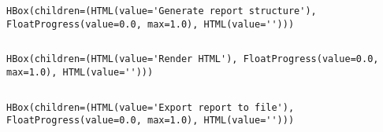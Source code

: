\documentclass[11pt]{article}
\begin{document}
    
    \begin{Verbatim}[commandchars=\\\{\}]
HBox(children=(HTML(value='Generate report structure'), FloatProgress(value=0.0, max=1.0), HTML(value='')))
    \end{Verbatim}

    
    \begin{Verbatim}[commandchars=\\\{\}]

    \end{Verbatim}

    
    \begin{Verbatim}[commandchars=\\\{\}]
HBox(children=(HTML(value='Render HTML'), FloatProgress(value=0.0, max=1.0), HTML(value='')))
    \end{Verbatim}

    
    \begin{Verbatim}[commandchars=\\\{\}]

    \end{Verbatim}

    
    \begin{Verbatim}[commandchars=\\\{\}]
HBox(children=(HTML(value='Export report to file'), FloatProgress(value=0.0, max=1.0), HTML(value='')))
    \end{Verbatim}

    
    \begin{Verbatim}[commandchars=\\\{\}]

    \end{Verbatim}


    
    
    
\end{document}
